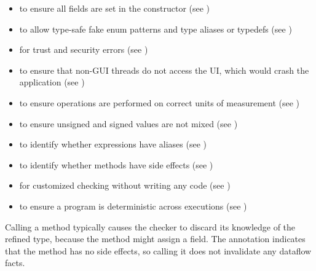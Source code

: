 \begin{itemize}
\item
   to ensure all
  fields are set in the constructor (see
  )
\item
   to allow type-safe fake enum
  patterns and type aliases or typedefs (see )
\item
   for trust and security errors
  (see )
\item
   to ensure that non-GUI
  threads do not access the UI, which would crash the application
  (see )
\item
   to ensure operations are
  performed on correct units of measurement
  (see )
\item
   to
  ensure unsigned and signed values are not mixed
  (see )
\item
   to identify whether
  expressions have aliases (see )
\item
   to identify whether
  methods have side effects (see )
\item
   for customized checking without
  writing any code (see )
\item
   to ensure a program is
  deterministic across executions (see )
\end{itemize}




Calling a method typically causes the checker to discard its knowledge of
the refined type, because the method might assign a field.
The  annotation indicates that
the method has no side effects, so calling it does not invalidate any
dataflow facts.

